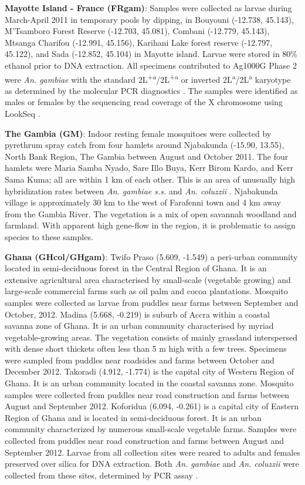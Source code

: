 \documentclass[a4paper,11pt,abstracton,hidelinks]{scrartcl}
\begin{document}
%
\textbf{Mayotte Island - France (FRgam)}: Samples were collected as larvae during March-April 2011 in temporary pools by dipping, in Bouyouni (-12.738, 45.143), M'Tsamboro Forest Reserve (-12.703, 45.081), Combani (-12.779, 45.143), Mtsanga Charifou (-12.991, 45.156), Karihani Lake forest reserve (-12.797, 45.122), and Sada (-12.852, 45.104) in Mayotte island.
%
Larvae were stored in 80\% ethanol prior to DNA extraction. 
%
All specimens contributed to Ag1000G Phase 2 were \textit{An. gambiae} \cite{santolamazza2004} with the standard 2L\textsuperscript{+a}/2L\textsuperscript{+a} or inverted 2L\textsuperscript{a}/2L\textsuperscript{a} karyotype as determined by the molecular PCR diagnostics \cite{White2007}.
%
The samples were identified as males or females by the sequencing read coverage of the X chromosome using LookSeq \cite{Manske2009}.

%
\textbf{The Gambia (GM)}: Indoor resting female mosquitoes were collected by pyrethrum spray catch from four hamlets around Njabakunda (-15.90, 13.55), North Bank Region, The Gambia between August and October 2011.
%
The four hamlets were Maria Samba Nyado, Sare Illo Buya, Kerr Birom Kardo, and Kerr Sama Kuma; all are within 1 km of each other.
%
This is an area of unusually high hybridization rates between \textit{An. gambiae s.s.} and \textit{An. coluzzii} \cite{Caputo2008, Nwakanma2013}.
%
Njabakunda village is approximately 30 km to the west of Farafenni town and 4 km away from the Gambia River.
%
The vegetation is a mix of open savannah woodland and farmland.
%
With apparent high gene-flow in the region, it is problematic to assign species to these samples.

%
\textbf{Ghana (GHcol/GHgam)}: Twifo Praso (5.609, -1.549) a peri-urban community located in semi-deciduous forest in the Central Region of Ghana.
%
It is an extensive agricultural area characterised by small-scale (vegetable growing) and large-scale commercial farms such as oil palm and cocoa plantations.
%
Mosquito samples were collected as larvae from puddles near farms between September and October, 2012.
%
Madina (5.668,	-0.219) is suburb of Accra within a coastal savanna zone of Ghana. 
%
It is an urban community characterised by myriad vegetable-growing areas.
%
The vegetation consists of mainly grassland interspersed with dense short thickets often less than 5 m high with a few trees.
%
Specimens were sampled from puddles near roadsides and farms between October and December 2012.
%
Takoradi (4.912, -1.774) is the capital city of Western Region of Ghana.
%
It is an urban community located in the coastal savanna zone.
%
Mosquito samples were collected from puddles near road construction and farms between August and September 2012.
%
Koforidua (6.094, -0.261) is a capital city of Eastern Region of Ghana and is located in semi-deciduous forest. 
%
It is an urban community characterized by numerous small-scale vegetable farms. 
%
Samples were collected from puddles near road construction and farms between August and September 2012.
%
Larvae from all collection sites were reared to adults and females preserved over silica for DNA extraction.
%
Both \textit{An. gambiae} and \textit{An. coluzzii} were collected from these sites, determined by PCR assay \cite{santolamazza2008}.
\end{document}
